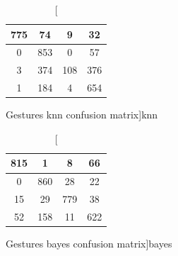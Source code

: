 \documentclass{classrep}
\begin{document}
{{{                \begin{table}[!htbp]
                    \begin{minipage}{.48\textwidth}
                        \centering
                        \begin{tabular}{|c|c|c|c|}
                            \hline
                            775 & 74 & 9 & 32 \\ \hline
                            0 & 853 & 0 & 57 \\ \hline
                            3 & 374 & 108 & 376 \\ \hline
                            1 & 184 & 4 & 654 \\ \hline
                        \end{tabular}
                        \caption
                        [Gestures knn confusion matrix]{knn}
                        \label{Gestures_knn_confusion_matrix}
                    \end{minipage}
                    \hfill
                    \begin{minipage}{.48\textwidth}
                        \centering
                        \begin{tabular}{|c|c|c|c|}
                            \hline
                            815 & 1 & 8 & 66 \\ \hline
                            0 & 860 & 28 & 22 \\ \hline
                            15 & 29 & 779 & 38 \\ \hline
                            52 & 158 & 11 & 622 \\ \hline
                        \end{tabular}
                        \caption
                        [Gestures bayes confusion matrix]{bayes}
                        \label{Gestures_bayes_confusion_matrix}
                    \end{minipage}
                \end{table}
                \FloatBarrier

}}}
\end{document}
